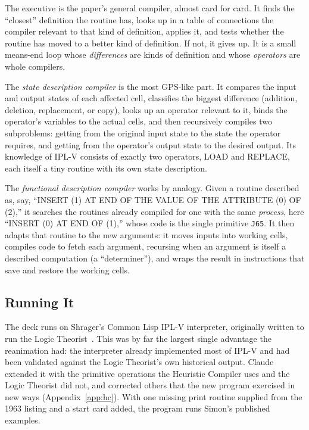 \documentclass[11pt]{article}
\begin{document}
The executive is the paper's general compiler,
almost card for card. It finds the ``closest'' definition the routine
has, looks up in a table of connections the compiler relevant to that
kind of definition, applies it, and tests whether the routine has moved
to a better kind of definition. If not, it gives up. It is a small
means-end loop whose \emph{differences} are kinds of definition and
whose \emph{operators} are whole compilers.

The \emph{state description compiler} is the
most GPS-like part. It compares the input and output states of each
affected cell, classifies the biggest difference (addition, deletion,
replacement, or copy), looks up an operator relevant to it, binds the
operator's variables to the actual cells, and then recursively compiles
two subproblems: getting from the original input state to the state the
operator requires, and getting from the operator's output state to the
desired output. Its knowledge of IPL-V consists of exactly two
operators, LOAD and REPLACE, each itself a tiny routine with its own
state description.

The \emph{functional description compiler} works by analogy. Given a routine described as, say, ``INSERT (1) AT
END OF THE VALUE OF THE ATTRIBUTE (0) OF (2),'' it searches the routines
already compiled for one with the same \emph{process}, here ``INSERT (0)
AT END OF (1),'' whose code is the single primitive \texttt{J65}. It
then adapts that routine to the new arguments: it moves inputs into
working cells, compiles code to fetch each argument, recursing when an
argument is itself a described computation (a ``determiner''), and
wraps the result in instructions that save and restore the working
cells.

\subsection{Running It}

The deck runs on Shrager's Common Lisp IPL-V interpreter, originally
written to run the Logic Theorist~\cite{shrager2026,shragerrepo}. This
was by far the largest single advantage the reanimation had: the
interpreter already implemented most of IPL-V and had been validated
against the Logic Theorist's own historical output. Claude extended it
with the primitive operations the Heuristic Compiler uses and the Logic
Theorist did not, and corrected others that the new program exercised
in new ways (Appendix~\ref{app:hc}). With one missing print routine
supplied from the 1963 listing and a start card added, the program runs
Simon's published examples.
\end{document}
